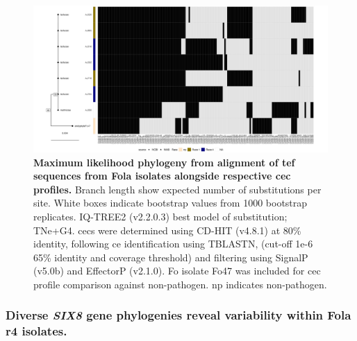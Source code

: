 \begin{figure}
    \centering
    \includegraphics[width=\textwidth]{Figures/HeatmapAndPhylo_LactucaeOnly.png}
    \captionsetup{width=24cm}
    \caption[Maximum likelihood phylogeny from alignment of \Acl{tef} sequences from \acl{Fola} and \acl{Foci} isolates alongside respective \acl{cec} profiles.]{\textbf{Maximum likelihood phylogeny from alignment of \Acf{tef} sequences from \acf{Fola} isolates alongside respective \acf{cec} profiles.}  Branch length show expected number of substitutions per site. White boxes indicate bootstrap values from 1000 bootstrap replicates. IQ-TREE2 (v2.2.0.3) best model of substitution; TNe+G4. \Acp{cec} were determined using CD-HIT (v4.8.1) at 80\% identity, following \ac{ce} identification using TBLASTN, (cut-off 1e-6 65\% identity and coverage threshold) and filtering using SignalP (v5.0b) and EffectorP (v2.1.0). \ac{Fo} isolate Fo47 was included for \ac{cec} profile comparison against non-pathogen. np indicates non-pathogen.}
    \label{fig:MaeiHeatmap-lettuce}
\end{figure}

\subsubsection{Diverse \textit{SIX8} gene phylogenies reveal variability within \acl{Fola} \acl{r4} isolates.}

